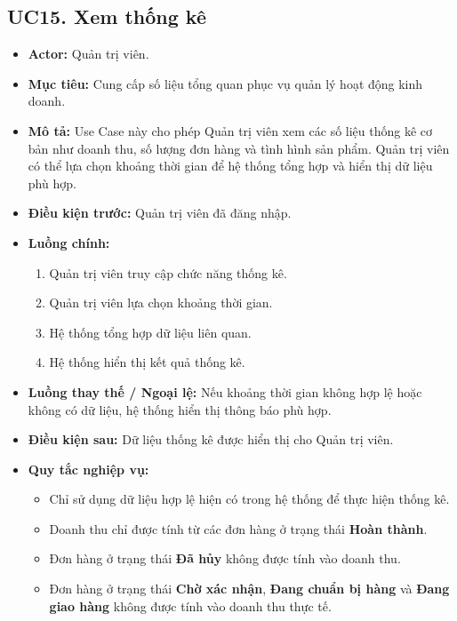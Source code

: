 \documentclass[12pt,a4paper]{article}
\begin{document}

\subsection*{UC15. Xem thống kê}

\begin{itemize}

 \item \textbf{Actor:} Quản trị viên.

 \item \textbf{Mục tiêu:} Cung cấp số liệu tổng quan phục vụ quản lý hoạt động kinh doanh.

 \item \textbf{Mô tả:} Use Case này cho phép Quản trị viên xem các số liệu thống kê cơ bản như doanh thu, số lượng đơn hàng và tình hình sản phẩm. Quản trị viên có thể lựa chọn khoảng thời gian để hệ thống tổng hợp và hiển thị dữ liệu phù hợp.

 \item \textbf{Điều kiện trước:} Quản trị viên đã đăng nhập.

 \item \textbf{Luồng chính:}

 \begin{enumerate}

  \item Quản trị viên truy cập chức năng thống kê.

  \item Quản trị viên lựa chọn khoảng thời gian.

  \item Hệ thống tổng hợp dữ liệu liên quan.

  \item Hệ thống hiển thị kết quả thống kê.

 \end{enumerate}

 \item \textbf{Luồng thay thế / Ngoại lệ:} Nếu khoảng thời gian không hợp lệ hoặc không có dữ liệu, hệ thống hiển thị thông báo phù hợp.

 \item \textbf{Điều kiện sau:} Dữ liệu thống kê được hiển thị cho Quản trị viên.

 \item \textbf{Quy tắc nghiệp vụ:}
    \begin{itemize}
        \item Chỉ sử dụng dữ liệu hợp lệ hiện có trong hệ thống để thực hiện thống kê.
        \item Doanh thu chỉ được tính từ các đơn hàng ở trạng thái \textbf{Hoàn thành}.
        \item Đơn hàng ở trạng thái \textbf{Đã hủy} không được tính vào doanh thu.
        \item Đơn hàng ở trạng thái \textbf{Chờ xác nhận}, \textbf{Đang chuẩn bị hàng} và \textbf{Đang giao hàng} không được tính vào doanh thu thực tế.
    \end{itemize}

\end{itemize}
\end{document}
